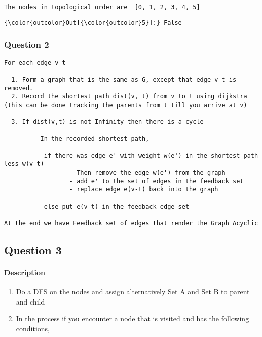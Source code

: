 \documentclass[11pt]{article}
\providecommand{\tightlist}{%
      \setlength{\itemsep}{0pt}\setlength{\parskip}{0pt}}
\begin{document}
    \begin{Verbatim}[commandchars=\\\{\}]
The nodes in topological order are  [0, 1, 2, 3, 4, 5]

    \end{Verbatim}

\begin{Verbatim}[commandchars=\\\{\}]
{\color{outcolor}Out[{\color{outcolor}5}]:} False
\end{Verbatim}
            
    \subsubsection{Question 2}\label{question-2}

    \begin{verbatim}
For each edge v-t

  1. Form a graph that is the same as G, except that edge v-t is removed.
  2. Record the shortest path dist(v, t) from v to t using dijkstra (this can be done tracking the parents from t till you arrive at v)

  3. If dist(v,t) is not Infinity then there is a cycle
  
          In the recorded shortest path,
          
           if there was edge e' with weight w(e') in the shortest path less w(v-t)
                  - Then remove the edge w(e') from the graph
                  - add e' to the set of edges in the feedback set 
                  - replace edge e(v-t) back into the graph

           else put e(v-t) in the feedback edge set

At the end we have Feedback set of edges that render the Graph Acyclic
\end{verbatim}

    \subsection{Question 3}\label{question-3}

    \paragraph{Description}\label{description}

\begin{enumerate}
\def\labelenumi{\arabic{enumi}.}
\tightlist
\item
  Do a DFS on the nodes and assign alternatively Set A and Set B to
  parent and child
\item
  In the process if you encounter a node that is visited and has the
  following conditions,
\end{enumerate}
\end{document}
